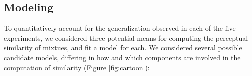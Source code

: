 \subsection{Modeling}
\label{sec:results_modeling}
To quantitatively account for the generalization observed in each of the five experiments, we considered three potential means for computing the perceptual similarity of mixtues, and fit a model for each.  We considered several possible candidate models, differing in how and which components are involved in the computation of similarity (Figure \ref{fig:cartoon}):